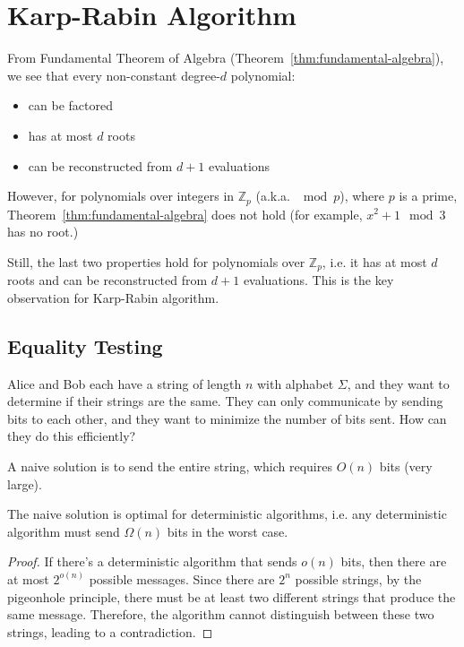\chapter{Karp-Rabin Algorithm}

From Fundamental Theorem of Algebra (Theorem~\ref{thm:fundamental-algebra}), we see that every non-constant degree-$d$ polynomial:

\begin{itemize}
	\item can be factored
	\item has at most $d$ roots
	\item can be reconstructed from $d+1$ evaluations
\end{itemize}

However, for polynomials over integers in $\mathbb Z_p$ (a.k.a. $\mod p$), where $p$ is a prime, Theorem~\ref{thm:fundamental-algebra} does not hold (for example, $x^2+1 \mod 3$ has no root.)

Still, the last two properties hold for polynomials over $\mathbb Z_p$, i.e. it has at most $d$ roots and can be reconstructed from $d+1$ evaluations. This is the key observation for Karp-Rabin algorithm.

\section{Equality Testing}

\begin{problem}
Alice and Bob each have a string of length $n$ with alphabet $\Sigma$, and they want to determine if their strings are the same. They can only communicate by sending bits to each other, and they want to minimize the number of bits sent. How can they do this efficiently?
\end{problem}

A naive solution is to send the entire string, which requires $O(n)$ bits (very large).

\begin{lemma}
	The naive solution is optimal for deterministic algorithms, i.e. any deterministic algorithm must send $\Omega(n)$ bits in the worst case.
\end{lemma}
\begin{proof}
	If there's a deterministic algorithm that sends $o(n)$ bits, then there are at most $2^{o(n)}$ possible messages. Since there are $2^n$ possible strings, by the pigeonhole principle, there must be at least two different strings that produce the same message. Therefore, the algorithm cannot distinguish between these two strings, leading to a contradiction.
\end{proof}

